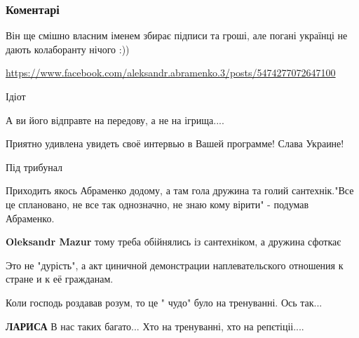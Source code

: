  
 
 
 
 
\subsubsection{Коментарі}
\label{sec:10_11_2021.fb.sternenko_sergej.1.abramenko_maguchih.cmt}

\begin{itemize} %

Він ще смішно власним іменем збирає підписи та гроші, але погані українці не дають колаборанту нічого :)) 

\url{https://www.facebook.com/aleksandr.abramenko.3/posts/5474277072647100}


Ідіот

А ви його відправте на передову, а не на ігрища....

Приятно удивлена увидеть своё интервью в Вашей программе!
Слава Украине!

Під трибунал


Приходить якось Абраменко додому, а там гола дружина та голий сантехнік."Все це
сплановано, не все так однозначно, не знаю кому вірити" - подумав Абраменко.

\begin{itemize} %
\textbf{Oleksandr Mazur} тому треба обійнялись із сантехніком, а дружина сфоткає
\end{itemize} %

Это не "дурість", а акт циничной демонстрации наплевательского отношения к стране и к её гражданам.

Коли господь роздавав розум, то це " чудо" було на тренуванні. Ось так...

\begin{itemize} %
\textbf{ЛАРИСА} В нас таких багато... Хто на тренуванні, хто на репєтіціі....
\end{itemize} %


\end{itemize}
